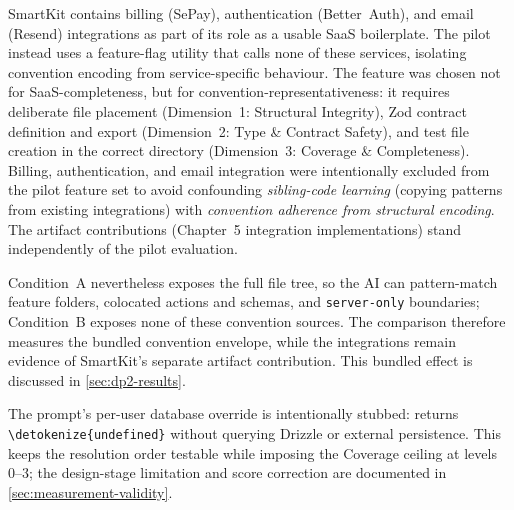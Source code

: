 \documentclass[12pt,a4paper]{report}
\newcommand{\code}[1]{\texttt{\nolinkurl{\detokenize{#1}}}}
\newcommand{\pkg}[1]{\texttt{\nolinkurl{#1}}}
\begin{document}
SmartKit contains billing (SePay), authentication (Better~Auth), and email (Resend) integrations as part of its role as a usable SaaS boilerplate. The pilot instead uses a feature-flag utility that calls none of these services, isolating convention encoding from service-specific behaviour. The feature was chosen not for SaaS-completeness, but for convention-representativeness: it requires deliberate file placement (Dimension~1: Structural Integrity), Zod contract definition and export (Dimension~2: Type \& Contract Safety), and test file creation in the correct directory (Dimension~3: Coverage \& Completeness). Billing, authentication, and email integration were intentionally excluded from the pilot feature set to avoid confounding \emph{sibling-code learning} (copying patterns from existing integrations) with \emph{convention adherence from structural encoding}. The artifact contributions (Chapter~5 integration implementations) stand independently of the pilot evaluation.

Condition~A nevertheless exposes the full file tree, so the AI can pattern-match feature folders, colocated actions and schemas, and \pkg{server-only} boundaries; Condition~B exposes none of these convention sources. The comparison therefore measures the bundled convention envelope, while the integrations remain evidence of SmartKit's separate artifact contribution. This bundled effect is discussed in \autoref{sec:dp2-results}.

The prompt's per-user database override is intentionally stubbed:  returns \code{undefined} without querying Drizzle or external persistence. This keeps the resolution order testable while imposing the Coverage ceiling at levels 0--3; the design-stage limitation and score correction are documented in \autoref{sec:measurement-validity}.
\end{document}
